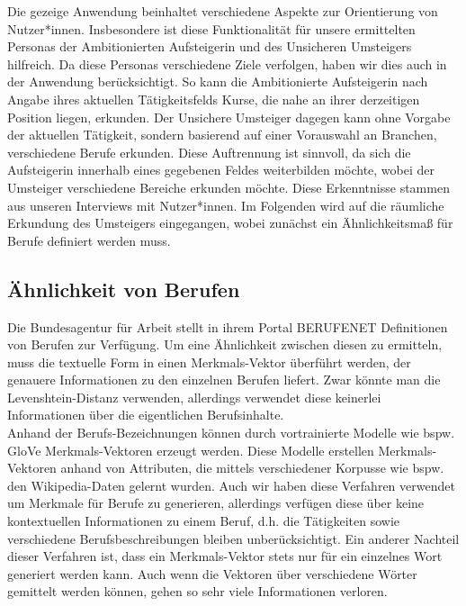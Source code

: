 \documentclass[10pt]{article}
\begin{document}
Die gezeige Anwendung beinhaltet verschiedene Aspekte zur Orientierung von
Nutzer*innen. Insbesondere ist diese Funktionalität für unsere ermittelten
Personas der Ambitionierten Aufsteigerin und des Unsicheren Umsteigers
hilfreich. Da diese Personas verschiedene Ziele verfolgen, haben wir dies auch
in der Anwendung berücksichtigt. So kann die Ambitionierte Aufsteigerin nach
Angabe ihres aktuellen Tätigkeitsfelds Kurse, die nahe an ihrer derzeitigen
Position liegen, erkunden. Der Unsichere Umsteiger dagegen kann ohne Vorgabe der
aktuellen Tätigkeit, sondern basierend auf einer Vorauswahl an Branchen,
verschiedene Berufe erkunden. Diese Auftrennung ist sinnvoll, da sich die
Aufsteigerin innerhalb eines gegebenen Feldes weiterbilden möchte, wobei der
Umsteiger verschiedene Bereiche erkunden möchte. Diese Erkenntnisse stammen aus
unseren Interviews mit Nutzer*innen. Im Folgenden wird auf die räumliche
Erkundung des Umsteigers eingegangen, wobei zunächst ein Ähnlichkeitsmaß für
Berufe definiert werden muss.

\subsection{Ähnlichkeit von Berufen}

Die Bundesagentur für Arbeit stellt in ihrem Portal BERUFENET Definitionen von
Berufen zur Verfügung. Um eine Ähnlichkeit zwischen diesen zu ermitteln, muss
die textuelle Form in einen Merkmals-Vektor überführt werden, der genauere
Informationen zu den einzelnen Berufen liefert. Zwar könnte man die
Levenshtein-Distanz verwenden, allerdings verwendet diese keinerlei
Informationen über die eigentlichen Berufsinhalte.\\

 Anhand der Berufs-Bezeichnungen können durch vortrainierte Modelle wie bspw.
 GloVe Merkmals-Vektoren erzeugt werden. Diese Modelle erstellen
 Merkmals-Vektoren anhand von Attributen, die mittels verschiedener Korpusse wie
 bspw. den Wikipedia-Daten gelernt wurden. Auch wir haben diese Verfahren
 verwendet um Merkmale für Berufe zu generieren, allerdings verfügen diese über
 keine kontextuellen Informationen zu einem Beruf, d.h. die Tätigkeiten sowie
 verschiedene Berufsbeschreibungen bleiben unberücksichtigt. Ein anderer
 Nachteil dieser Verfahren ist, dass ein Merkmals-Vektor stets nur für ein
 einzelnes Wort generiert werden kann. Auch wenn die Vektoren über verschiedene
 Wörter gemittelt werden können, gehen so sehr viele Informationen verloren.\\
\end{document}
